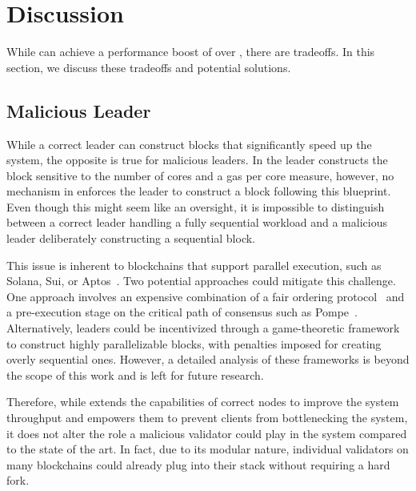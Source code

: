\section{Discussion}
\label{sec:discussion}

While \sys can achieve a performance boost of over \sysmax, there are tradeoffs. In this section, we discuss these tradeoffs and potential solutions.

\subsection{Malicious Leader}

While a correct leader can construct blocks that significantly speed up the system, the opposite is true for malicious leaders. In \sys the leader constructs the block sensitive to the number of cores and a gas per core measure, however, no mechanism in \sys enforces the leader to construct a block following this blueprint. Even though this might seem like an oversight, it is impossible to distinguish between a correct leader handling a fully sequential workload and a malicious leader deliberately constructing a sequential block.

This issue is inherent to blockchains that support parallel execution, such as Solana, Sui, or Aptos~\cite{solana,sui,aptos}. Two potential approaches could mitigate this challenge. One approach involves an expensive combination of a fair ordering protocol~\cite{fairordering} and a pre-execution stage on the critical path of consensus such as Pompe~\cite{zhang2020byzantine}. Alternatively, leaders could be incentivized through a game-theoretic framework to construct highly parallelizable blocks, with penalties imposed for creating overly sequential ones. However, a detailed analysis of these frameworks is beyond the scope of this work and is left for future research.

Therefore, while \sys extends the capabilities of correct nodes to improve the system throughput and empowers them to prevent clients from bottlenecking the system, it does not alter the role a malicious validator could play in the system compared to the state of the art. In fact, due to its modular nature, individual validators on many blockchains could already plug \sys into their stack without requiring a hard fork.


